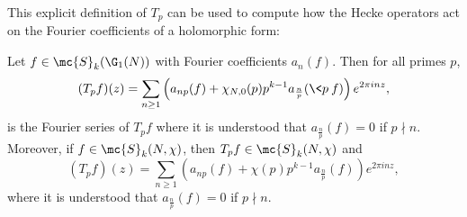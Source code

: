     This explicit definition of $T_{p}$ can be used to compute how the Hecke operators act on the Fourier coefficients of a holomorphic form:

    \begin{proposition}\label{prop:prime_Hecke_operators_acting_on_Fourier_coefficients_holomorphic}
      Let $f \in \mc{S}_{k}(\G_{1}(N))$ with Fourier coefficients $a_{n}(f)$. Then for all primes $p$,
      \[
        (T_{p}f)(z) = \sum_{n \ge 1}\left(a_{np}(f)+\chi_{N,0}(p)p^{k-1}a_{\frac{n}{p}}(\<p\>f)\right)e^{2\pi inz},
      \]
      is the Fourier series of $T_{p}f$ where it is understood that $a_{\frac{n}{p}}(f) = 0$ if $p \nmid n$. Moreover, if $f \in \mc{S}_{k}(N,\chi)$, then $T_{p}f \in \mc{S}_{k}(N,\chi)$ and
      \[
        (T_{p}f)(z) = \sum_{n \ge 1}\left(a_{np}(f)+\chi(p)p^{k-1}a_{\frac{n}{p}}(f)\right)e^{2\pi inz},
      \]
      where it is understood that $a_{\frac{n}{p}}(f) = 0$ if $p \nmid n$.
    \end{proposition}
